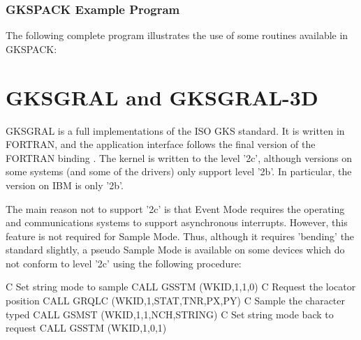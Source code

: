\subsection{GKSPACK Example Program}
 
The following complete program illustrates the use of some
routines available in GKSPACK:
\chapter{\protect\label{sec:gtschap}GKSGRAL and GKSGRAL-3D}
 
GKSGRAL is a full implementations of the ISO GKS standard.
It is written in FORTRAN, and the application interface follows
the final version of the FORTRAN binding \cite{bib-gksftn}.
The kernel is written to the level '2c', although versions on
some systems (and some of the drivers) only support level '2b'.
In particular, the version on IBM is only '2b'.
 
The main reason not to support '2c' is that Event Mode requires
the operating and communications systems to support asynchronous
interrupts. However, this feature is not required for Sample Mode.
Thus, although it requires 'bending' the standard slightly,
a pseudo Sample Mode is available on some devices which do not conform
to level '2c' using the following procedure:
\begin{XMP}
C     Set string mode to sample
      CALL GSSTM (WKID,1,1,0)
C     Request the locator position
      CALL GRQLC (WKID,1,STAT,TNR,PX,PY)
C     Sample the character typed
      CALL GSMST (WKID,1,1,NCH,STRING)
C     Set string mode back to request
      CALL GSSTM (WKID,1,0,1)
\end{XMP}
 
